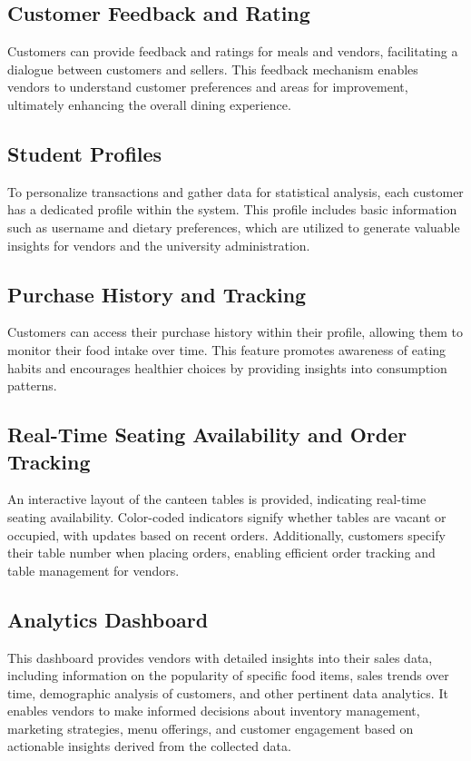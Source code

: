 \subsection{Customer Feedback and Rating}
Customers can provide feedback and ratings for meals and vendors, facilitating a dialogue between customers and sellers. This feedback mechanism enables vendors to understand customer preferences and areas for improvement, ultimately enhancing the overall dining experience.

\subsection{Student Profiles}
To personalize transactions and gather data for statistical analysis, each customer has a dedicated profile within the system. This profile includes basic information such as username and dietary preferences, which are utilized to generate valuable insights for vendors and the university administration.

\subsection{Purchase History and Tracking}
Customers can access their purchase history within their profile, allowing them to monitor their food intake over time. This feature promotes awareness of eating habits and encourages healthier choices by providing insights into consumption patterns.

\subsection{Real-Time Seating Availability and Order Tracking}
An interactive layout of the canteen tables is provided, indicating real-time seating availability. Color-coded indicators signify whether tables are vacant or occupied, with updates based on recent orders. Additionally, customers specify their table number when placing orders, enabling efficient order tracking and table management for vendors.

\subsection{Analytics Dashboard}
This dashboard provides vendors with detailed insights into their sales data, including information on the popularity of specific food items, sales trends over time, demographic analysis of customers, and other pertinent data analytics. It enables vendors to make informed decisions about inventory management, marketing strategies, menu offerings, and customer engagement based on actionable insights derived from the collected data.
